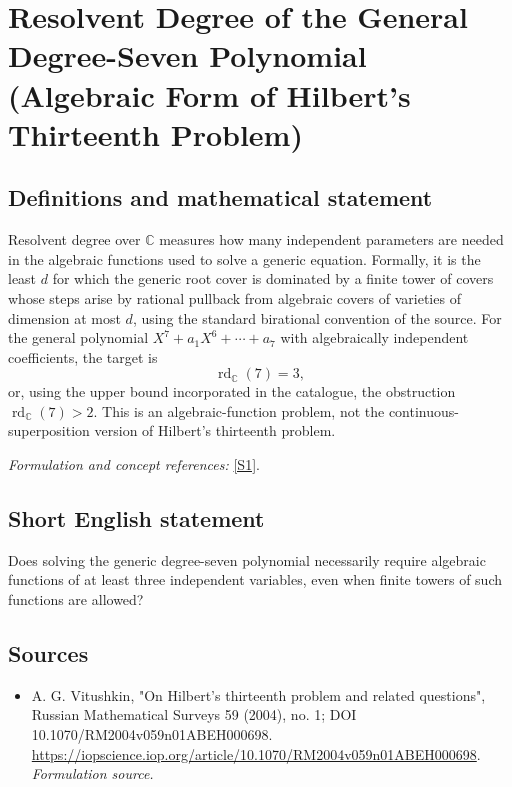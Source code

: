 \documentclass[11pt]{article}
\begin{document}
\section*{\texorpdfstring{Resolvent Degree of the General Degree-Seven Polynomial (Algebraic Form of Hilbert's Thirteenth Problem)}{Resolvent Degree of the General Degree-Seven Polynomial (Algebraic Form of Hilbert's Thirteenth Problem)}}\label{283}
\subsection{Definitions and mathematical statement}
Resolvent degree over ${\mathbb{C}}$ measures how many independent parameters are needed in the algebraic functions used to solve a generic equation. Formally, it is the least $d$ for which the generic root cover is dominated by a finite tower of covers whose steps arise by rational pullback from algebraic covers of varieties of dimension at most $d$, using the standard birational convention of the source. For the general polynomial
$X^7+a_1X^6+\cdots+a_7$ with algebraically independent coefficients, the target is
\[
 \operatorname{rd}_{{\mathbb{C}}}(7)=3,
\]
or, using the upper bound incorporated in the catalogue, the obstruction $\operatorname{rd}_{{\mathbb{C}}}(7)>2$. This is an algebraic-function problem, not the continuous-superposition version of Hilbert's thirteenth problem.
\par\smallskip\textit{Formulation and concept references:} \href{https://iopscience.iop.org/article/10.1070/RM2004v059n01ABEH000698}{[S1]}.

\subsection{Short English statement}
Does solving the generic degree-seven polynomial necessarily require algebraic functions of at least three independent variables, even when finite towers of such functions are allowed?
\subsection{Sources}
\begin{itemize}
\item[S1]A. G. Vitushkin, "On Hilbert's thirteenth problem and related questions", Russian Mathematical Surveys 59 (2004), no. 1; DOI 10.1070/RM2004v059n01ABEH000698.
\url{https://iopscience.iop.org/article/10.1070/RM2004v059n01ABEH000698}.
\textit{Formulation source.}
\end{itemize}
\end{document}
